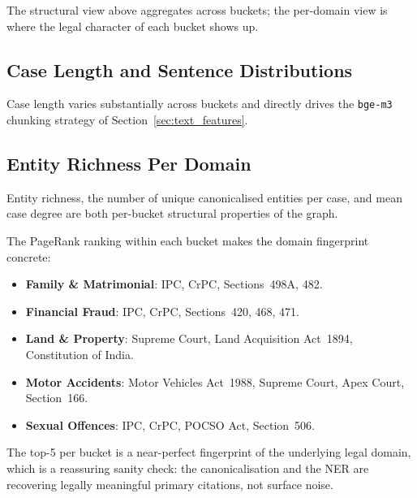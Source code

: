 The structural view above aggregates across buckets; the per-domain
view is where the legal character of each bucket shows up.

\subsection{Case Length and Sentence Distributions}

Case length varies substantially across buckets and directly drives
the \texttt{bge-m3} chunking strategy of
Section~\ref{sec:text_features}.

\subsection{Entity Richness Per Domain}

Entity richness, the number of unique canonicalised entities per
case, and mean case degree are both per-bucket structural
properties of the graph.%

The PageRank ranking within each bucket makes the domain fingerprint concrete:

\begin{itemize}
  \item \textbf{Family \& Matrimonial}: IPC, CrPC, Sections~498A, 482.
  \item \textbf{Financial Fraud}: IPC, CrPC, Sections~420, 468, 471.
  \item \textbf{Land \& Property}: Supreme Court, Land Acquisition
    Act~1894, Constitution of India.
  \item \textbf{Motor Accidents}: Motor Vehicles Act~1988, Supreme Court,
    Apex Court, Section~166.
  \item \textbf{Sexual Offences}: IPC, CrPC, POCSO Act, Section~506.
\end{itemize}

The top-5 per bucket is a near-perfect fingerprint of the underlying
legal domain, which is a reassuring sanity check: the canonicalisation
and the NER are recovering legally meaningful primary citations, not
surface noise.

